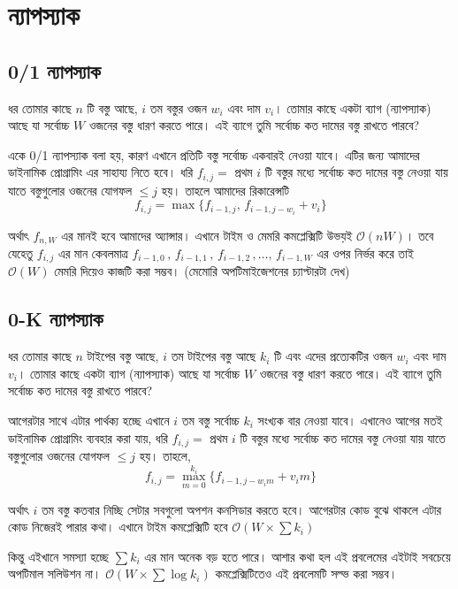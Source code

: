 \chapter{ন্যাপস্যাক}
\section{0/1 ন্যাপস্যাক}
ধর তোমার কাছে \(n\) টি বস্তু আছে, \(i\) তম বস্তুর ওজন \(w_{i}\) এবং দাম \(v_{i}\)। তোমার কাছে একটা ব্যাগ (ন্যাপস্যাক) আছে যা সর্বোচ্চ \(W\) ওজনের বস্তু ধারণ করতে পারে। এই ব্যাগে তুমি সর্বোচ্চ কত দামের বস্তু রাখতে পারবে?

একে 0/1 ন্যাপস্যাক বলা হয়, কারণ এখানে প্রতিটি বস্তু সর্বোচ্চ একবারই নেওয়া যাবে। এটির জন্য আমাদের ডাইনামিক প্রোগ্রামিং এর সাহায্য নিতে হবে। ধরি \(f_{i, j} = \) প্রথম \(i\) টি বস্তুর মধ্যে সর্বোচ্চ কত দামের বস্তু নেওয়া যায় যাতে বস্তুগুলোর ওজনের যোগফল \(\leq j\) হয়। তাহলে আমাদের রিকারেন্সটি
\[f_{i, j} = \max \lbrace f_{i - 1, j}, \, f_{i - 1, j - w_{i}} + v_{i} \rbrace\]

অর্থাৎ \(f_{n, W}\) এর মানই হবে আমাদের অ্যান্সার। এখানে টাইম ও মেমরি কমপ্লেক্সিটি উভয়ই \(\mathcal{O}(nW)\)।
তবে যেহেতু \(f_{i, j}\) এর মান কেবলমাত্র \(f_{i - 1, 0} \, , \, f_{i - 1, 1} \, , \, f_{i - 1, 2} \, , \dots, \, f_{i - 1, W}\) এর ওপর নির্ভর করে তাই \(\mathcal{O}(W)\) মেমরি দিয়েও কাজটি করা সম্ভব। (মেমোরি অপটিমাইজেশনের চ্যাপ্টারটা দেখ) 

\section{0-K ন্যাপস্যাক}
ধর তোমার কাছে \(n\) টাইপের বস্তু আছে, \(i\) তম টাইপের বস্তু আছে \(k_{i}\) টি এবং এদের প্রত্যেকটির ওজন \(w_{i}\) এবং দাম \(v_{i}\)। তোমার কাছে একটা ব্যাগ (ন্যাপস্যাক) আছে যা সর্বোচ্চ \(W\) ওজনের বস্তু ধারণ করতে পারে। এই ব্যাগে তুমি সর্বোচ্চ কত দামের বস্তু রাখতে পারবে?

আগেরটার সাথে এটার পার্থক্য হচ্ছে এখানে \(i\) তম বস্তু সর্বোচ্চ \(k_{i}\) সংখ্যক বার নেওয়া যাবে। এখানেও আগের মতই ডাইনামিক প্রোগ্রামিং ব্যবহার করা যায়, ধরি \(f_{i, j} = \) প্রথম \(i\) টি বস্তুর মধ্যে সর্বোচ্চ কত দামের বস্তু নেওয়া যায় যাতে বস্তুগুলোর ওজনের যোগফল \(\leq j\) হয়। তাহলে, 
\[f_{i, j} = \max_{m = 0}^{k_{i}} \lbrace f_{i - 1, j - w_{i}m} + v_{i}m \rbrace\]

অর্থাৎ \(i\) তম বস্তু কতবার নিচ্ছি সেটার সবগুলো অপশন কনসিডার করতে হবে। আগেরটার কোড বুঝে থাকলে এটার কোড নিজেরই পারার কথা। এখানে টাইম কমপ্লেক্সিটি হবে \(\mathcal{O}(W \times \sum k_{i})\) 

কিন্তু এইখানে সমস্যা হচ্ছে \(\sum k_{i}\) এর মান অনেক বড় হতে পারে। আশার কথা হল এই প্রবলেমের এইটাই সবচেয়ে অপটিমাল সলিউশন না। \(\mathcal{O}(W \times \sum \log k_{i})\) কমপ্লেক্সিটিতেও এই প্রবলেমটি সল্ভ করা সম্ভব।

